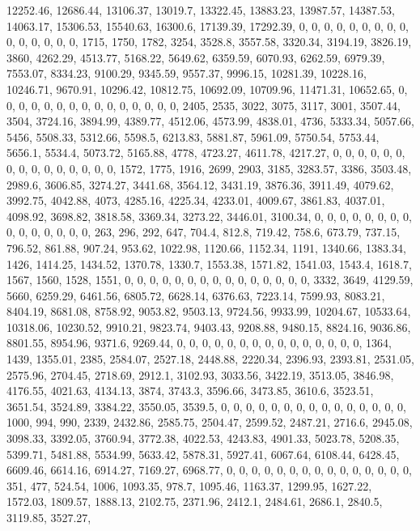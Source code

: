 \documentclass[
]{article}
\begin{document}
12252.46, 12686.44, 13106.37, 13019.7, 13322.45, 13883.23, 13987.57,
14387.53, 14063.17, 15306.53, 15540.63, 16300.6, 17139.39, 17292.39, 0,
0, 0, 0, 0, 0, 0, 0, 0, 0, 0, 0, 0, 0, 0, 1715, 1750, 1782, 3254,
3528.8, 3557.58, 3320.34, 3194.19, 3826.19, 3860, 4262.29, 4513.77,
5168.22, 5649.62, 6359.59, 6070.93, 6262.59, 6979.39, 7553.07, 8334.23,
9100.29, 9345.59, 9557.37, 9996.15, 10281.39, 10228.16, 10246.71,
9670.91, 10296.42, 10812.75, 10692.09, 10709.96, 11471.31, 10652.65, 0,
0, 0, 0, 0, 0, 0, 0, 0, 0, 0, 0, 0, 0, 0, 2405, 2535, 3022, 3075, 3117,
3001, 3507.44, 3504, 3724.16, 3894.99, 4389.77, 4512.06, 4573.99,
4838.01, 4736, 5333.34, 5057.66, 5456, 5508.33, 5312.66, 5598.5,
6213.83, 5881.87, 5961.09, 5750.54, 5753.44, 5656.1, 5534.4, 5073.72,
5165.88, 4778, 4723.27, 4611.78, 4217.27, 0, 0, 0, 0, 0, 0, 0, 0, 0, 0,
0, 0, 0, 0, 0, 1572, 1775, 1916, 2699, 2903, 3185, 3283.57, 3386,
3503.48, 2989.6, 3606.85, 3274.27, 3441.68, 3564.12, 3431.19, 3876.36,
3911.49, 4079.62, 3992.75, 4042.88, 4073, 4285.16, 4225.34, 4233.01,
4009.67, 3861.83, 4037.01, 4098.92, 3698.82, 3818.58, 3369.34, 3273.22,
3446.01, 3100.34, 0, 0, 0, 0, 0, 0, 0, 0, 0, 0, 0, 0, 0, 0, 0, 263, 296,
292, 647, 704.4, 812.8, 719.42, 758.6, 673.79, 737.15, 796.52, 861.88,
907.24, 953.62, 1022.98, 1120.66, 1152.34, 1191, 1340.66, 1383.34, 1426,
1414.25, 1434.52, 1370.78, 1330.7, 1553.38, 1571.82, 1541.03, 1543.4,
1618.7, 1567, 1560, 1528, 1551, 0, 0, 0, 0, 0, 0, 0, 0, 0, 0, 0, 0, 0,
0, 0, 3332, 3649, 4129.59, 5660, 6259.29, 6461.56, 6805.72, 6628.14,
6376.63, 7223.14, 7599.93, 8083.21, 8404.19, 8681.08, 8758.92, 9053.82,
9503.13, 9724.56, 9933.99, 10204.67, 10533.64, 10318.06, 10230.52,
9910.21, 9823.74, 9403.43, 9208.88, 9480.15, 8824.16, 9036.86, 8801.55,
8954.96, 9371.6, 9269.44, 0, 0, 0, 0, 0, 0, 0, 0, 0, 0, 0, 0, 0, 0, 0,
1364, 1439, 1355.01, 2385, 2584.07, 2527.18, 2448.88, 2220.34, 2396.93,
2393.81, 2531.05, 2575.96, 2704.45, 2718.69, 2912.1, 3102.93, 3033.56,
3422.19, 3513.05, 3846.98, 4176.55, 4021.63, 4134.13, 3874, 3743.3,
3596.66, 3473.85, 3610.6, 3523.51, 3651.54, 3524.89, 3384.22, 3550.05,
3539.5, 0, 0, 0, 0, 0, 0, 0, 0, 0, 0, 0, 0, 0, 0, 0, 1000, 994, 990,
2339, 2432.86, 2585.75, 2504.47, 2599.52, 2487.21, 2716.6, 2945.08,
3098.33, 3392.05, 3760.94, 3772.38, 4022.53, 4243.83, 4901.33, 5023.78,
5208.35, 5399.71, 5481.88, 5534.99, 5633.42, 5878.31, 5927.41, 6067.64,
6108.44, 6428.45, 6609.46, 6614.16, 6914.27, 7169.27, 6968.77, 0, 0, 0,
0, 0, 0, 0, 0, 0, 0, 0, 0, 0, 0, 0, 351, 477, 524.54, 1006, 1093.35,
978.7, 1095.46, 1163.37, 1299.95, 1627.22, 1572.03, 1809.57, 1888.13,
2102.75, 2371.96, 2412.1, 2484.61, 2686.1, 2840.5, 3119.85, 3527.27,
\end{document}
